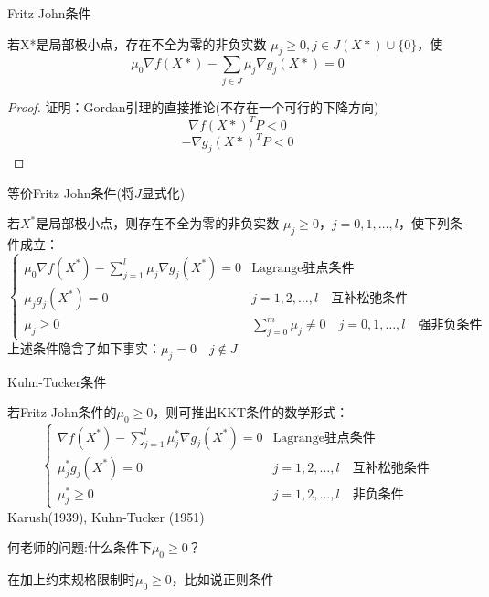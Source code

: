 \documentclass[12pt, a4paper, oneside, UTF8]{ctexbook}
\begin{document}
\begin{theorem}
    Fritz John条件

若X*是局部极小点，存在不全为零的非负实数 \( \mu_j \geq 0, j \in J(X*) \cup \{0\} \)，使
\[
\mu_0 \nabla f(X*) - \sum_{j \in J} \mu_j \nabla g_j(X*) = 0
\]
\end{theorem}

\begin{proof}
    证明：Gordan引理的直接推论(不存在一个可行的下降方向)
\[
\nabla f(X*)^T P < 0
\]
\[
-\nabla g_j(X*)^T P < 0
\]
\end{proof}

\begin{remark}
    等价Fritz John条件(将$J$显式化)

若$X^*$是局部极小点，则存在不全为零的非负实数 $\mu_j \geq 0$，$j = 0, 1, \ldots, l$，使下列条件成立：
$$
\begin{cases}
\mu_0 \nabla f(X^*) - \sum_{j=1}^{l} \mu_j \nabla g_j(X^*) = 0 & \text{Lagrange驻点条件} \\
\mu_j g_j(X^*) = 0 & j = 1, 2, \ldots, l \quad \text{互补松弛条件} \\
\mu_j \geq 0 & \sum_{j=0}^{m} \mu_j \neq 0 \quad j = 0, 1, \ldots, l \quad \text{强非负条件}
\end{cases}
$$
上述条件隐含了如下事实：$\mu_j = 0 \quad j \notin J$
\end{remark}

\begin{definition}
    Kuhn-Tucker条件

若Fritz John条件的$\mu_0\ge0$，则可推出KKT条件的数学形式：
$$
\begin{cases}
\nabla f(X^*) - \sum_{j=1}^{l} \mu_j^* \nabla g_j(X^*) = 0 & \text{Lagrange驻点条件} \\
\mu_j^* g_j(X^*) = 0 & j = 1, 2, \ldots, l \quad \text{互补松弛条件} \\
\mu_j^* \geq 0 & j = 1, 2, \ldots, l \quad \text{非负条件}
\end{cases}
$$
Karush(1939), Kuhn-Tucker (1951)
\end{definition}

何老师的问题:什么条件下$\mu_0\ge0$？

在加上约束规格限制时$\mu_0\ge0$，比如说正则条件
\end{document}
